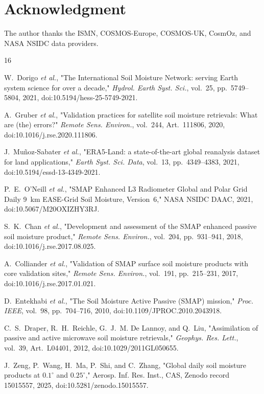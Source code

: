 \documentclass[journal]{IEEEtran}
\begin{document}
\section*{Acknowledgment}
The author thanks the ISMN, COSMOS-Europe, COSMOS-UK, CosmOz, and NASA
NSIDC data providers.

\begin{thebibliography}{16}

W.~Dorigo \emph{et al.}, "The International Soil Moisture Network:
serving Earth system science for over a decade," \emph{Hydrol. Earth
Syst. Sci.}, vol.~25, pp.~5749–5804, 2021,
doi:10.5194/hess-25-5749-2021.

A.~Gruber \emph{et al.}, "Validation practices for satellite soil
moisture retrievals: What are (the) errors?" \emph{Remote Sens.
Environ.}, vol.~244, Art.~111806, 2020,
doi:10.1016/j.rse.2020.111806.

J.~Mu\~{n}oz-Sabater \emph{et al.}, "ERA5-Land: a state-of-the-art
global reanalysis dataset for land applications," \emph{Earth Syst.
Sci. Data}, vol.~13, pp.~4349–4383, 2021,
doi:10.5194/essd-13-4349-2021.

P.~E.~O'Neill \emph{et al.}, "SMAP Enhanced L3 Radiometer Global and
Polar Grid Daily 9~km EASE-Grid Soil Moisture, Version~6," NASA NSIDC
DAAC, 2021, doi:10.5067/M20OXIZHY3RJ.

S.~K.~Chan \emph{et al.}, "Development and assessment of the SMAP
enhanced passive soil moisture product," \emph{Remote Sens.
Environ.}, vol.~204, pp.~931–941, 2018,
doi:10.1016/j.rse.2017.08.025.

A.~Colliander \emph{et al.}, "Validation of SMAP surface soil moisture
products with core validation sites," \emph{Remote Sens. Environ.},
vol.~191, pp.~215–231, 2017, doi:10.1016/j.rse.2017.01.021.

D.~Entekhabi \emph{et al.}, "The Soil Moisture Active Passive (SMAP)
mission," \emph{Proc. IEEE}, vol.~98, pp.~704–716, 2010,
doi:10.1109/JPROC.2010.2043918.

C.~S.~Draper, R.~H.~Reichle, G.~J.~M. De Lannoy, and Q.~Liu,
"Assimilation of passive and active microwave soil moisture
retrievals," \emph{Geophys. Res. Lett.}, vol.~39, Art.~L04401, 2012,
doi:10.1029/2011GL050655.

J.~Zeng, P.~Wang, H.~Ma, P.~Shi, and C.~Zhang, "Global daily soil
moisture products at $0.1^\circ$ and $0.25^\circ$," Aerosp. Inf. Res.
Inst., CAS, Zenodo record 15015557, 2025,
doi:10.5281/zenodo.15015557.


\end{thebibliography}
\end{document}
